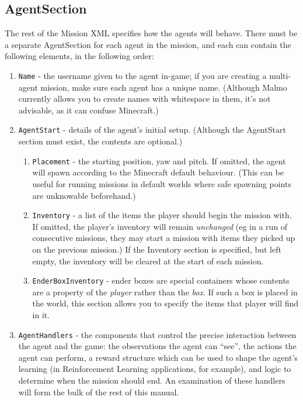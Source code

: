 \documentclass[11pt]{article} %
\begin{document}
\subsection{AgentSection}

The rest of the Mission XML specifies how the agents will behave. There must be a separate AgentSection for each agent in the mission, and each can contain the following elements, in the following order:

\begin{enumerate}
  \item \lstinline!Name! - the username given to the agent in-game; if you are creating a multi-agent mission, make sure each agent has a unique name. (Although Malmo currently allows you to create names with whitespace in them, it's not advisable, as it can confuse Minecraft.)
  \item \lstinline!AgentStart! - details of the agent's initial setup. (Although the AgentStart section must exist, the contents are optional.)
  \begin{enumerate}
    \item \lstinline!Placement! - the starting position, yaw and pitch. If omitted, the agent will spawn according to the Minecraft default behaviour. (This can be useful for running missions in default worlds where safe spawning points are unknowable beforehand.)
    \item \lstinline!Inventory! - a list of the items the player should begin the mission with. If omitted, the player's inventory will remain \emph{unchanged} (eg in a run of consecutive missions, they may start a mission with items they picked up on the previous mission.) If the Inventory section is specified, but left empty, the inventory will be cleared at the start of each mission.
    \item \lstinline!EnderBoxInventory! - ender boxes are special containers whose contents are a property of the \emph{player} rather than the \emph{box}. If such a box is placed in the world, this section allows you to specify the items that player will find in it.
  \end{enumerate}
  \item \lstinline!AgentHandlers! - the components that control the precise interaction between the agent and the game: the observations the agent can ``see'', the actions the agent can perform, a reward structure which can be used to shape the agent's learning (in Reinforcement Learning applications, for example), and logic to determine when the mission should end. An examination of these handlers will form the bulk of the rest of this manual.
\end{enumerate}
\end{document}

